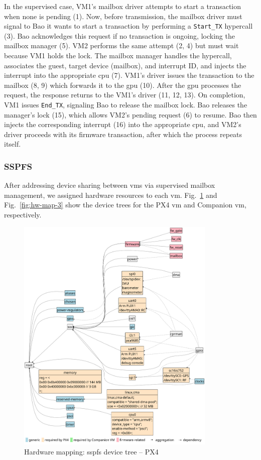 In the supervised case, VM1's mailbox driver attempts to start a
transaction when none is pending (1). Now,
before transmission, the mailbox driver must signal to Bao it wants
to start a transaction by performing a \lstinline{Start_TX} hypercall (3). Bao
acknowledges this request if no transaction is ongoing, locking the
mailbox manager (5).
VM2 performs the same attempt (2, 4) but must wait because VM1 holds the lock.
%
The mailbox manager handles the hypercall,
associates the guest, target device (mailbox), and interrupt ID, and injects the
interrupt into the appropriate \gls{cpu} (7).
%
VM1's driver issues the transaction to the mailbox (8, 9) which
forwards it to the \gls{gpu} (10).
%
After the \gls{gpu} processes the request, the response returns to the VM1's
driver (11, 12, 13). On completion, VM1 issues \lstinline{End_TX}, signaling Bao
to release the mailbox lock. Bao releases the manager's lock (15), which allows
VM2's pending request (6) to resume. Bao then injects the corresponding
interrupt (16) into the appropriate \gls{cpu}, and VM2's driver proceeds with
its firmware transaction, after which the process repeats itself.

\subsubsection{SSPFS}
\label{sec:final-scenario}
After addressing device sharing between \glspl{vm} via supervised mailbox
management, we assigned hardware resources to each \gls{vm}.
%
Fig.~\ref{fig:hw-map-2} and Fig.~\ref{fig:hw-map-3} show the device trees
for the PX4 \gls{vm} and Companion \gls{vm}, respectively.

\begin{figure}[!hbt]
  \centering
  \includegraphics[width=0.85\textwidth]{./img/pdf/hw-map-2} 
  \caption[Hardware mapping: SSPFS device tree -- PX4]{Hardware mapping:
  \gls{sspfs} device tree -- PX4}%
  \label{fig:hw-map-2}
\end{figure}

